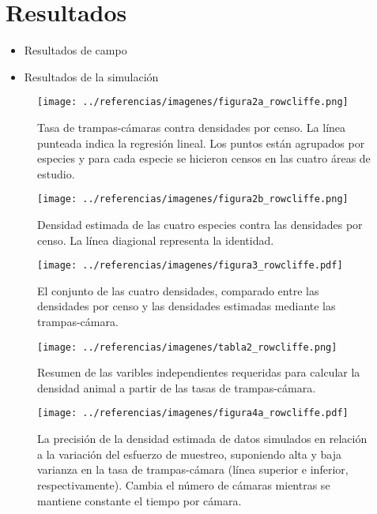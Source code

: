 \section{Resultados}
\begin{frame}
\begin{itemize}
  \item Resultados de campo
  \item Resultados de la simulaci\'on
\end{itemize}
\end{frame}
\begin{frame}
\begin{figure}[h]
\centering
\texttt{[image: ../referencias/imagenes/figura2a\_rowcliffe.png]}
\caption{Tasa de trampas-c\'amaras contra densidades por censo. La l\'inea
punteada indica la regresi\'on lineal. Los puntos est\'an agrupados por especies
y para cada especie se hicieron censos en las cuatro \'areas de estudio.}
\label{figura2a}
\end{figure}
\end{frame}
\begin{frame}
\begin{figure}[h]
\centering
\texttt{[image: ../referencias/imagenes/figura2b\_rowcliffe.png]}
\caption{Densidad estimada de las cuatro especies contra las densidades por
censo. La l\'inea diagional representa la identidad.}
\label{figura2b}
\end{figure}
\end{frame}
\begin{frame}
\begin{figure}[h]
\centering
\texttt{[image: ../referencias/imagenes/figura3\_rowcliffe.pdf]}
\caption{El conjunto de las cuatro densidades, comparado entre las densidades
por censo y las densidades estimadas mediante las trampas-c\'amara.}
\label{figura3}
\end{figure}
\end{frame}
\begin{frame}
\begin{figure}[h]
\centering
\texttt{[image: ../referencias/imagenes/tabla2\_rowcliffe.png]}
\caption{Resumen de las varibles independientes requeridas para calcular la
densidad animal a partir de las tasas de trampas-c\'amara.}
\label{tabla2}
\end{figure}
\end{frame}
\begin{frame}
\begin{figure}[h]
\centering
\texttt{[image: ../referencias/imagenes/figura4a\_rowcliffe.pdf]}
\caption{
La precisi\'on de la densidad estimada de datos simulados en relaci\'on
a la variaci\'on del esfuerzo de muestreo, suponiendo alta y baja varianza en
la tasa de trampas-c\'amara (l\'inea superior e inferior, respectivamente).
Cambia el n\'umero de c\'amaras mientras se mantiene constante el tiempo por
c\'amara.}
\label{figura4a}
\end{figure}
\end{frame}
